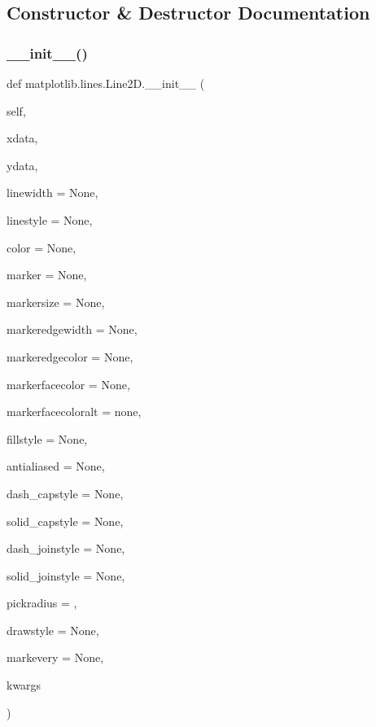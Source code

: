 \subsection{Constructor \& Destructor Documentation}
\mbox{\label{classmatplotlib_1_1lines_1_1Line2D_ac8fbafde2dbca785493d2eeefa1540b9}} 
\subsubsection{\texorpdfstring{\+\_\+\+\_\+init\+\_\+\+\_\+()}{\_\_init\_\_()}}
{\footnotesize\ttfamily def matplotlib.\+lines.\+Line2\+D.\+\_\+\+\_\+init\+\_\+\+\_\+ (\begin{DoxyParamCaption}\item[{}]{self,  }\item[{}]{xdata,  }\item[{}]{ydata,  }\item[{}]{linewidth = {\ttfamily None},  }\item[{}]{linestyle = {\ttfamily None},  }\item[{}]{color = {\ttfamily None},  }\item[{}]{marker = {\ttfamily None},  }\item[{}]{markersize = {\ttfamily None},  }\item[{}]{markeredgewidth = {\ttfamily None},  }\item[{}]{markeredgecolor = {\ttfamily None},  }\item[{}]{markerfacecolor = {\ttfamily None},  }\item[{}]{markerfacecoloralt = {\ttfamily \textquotesingle{}none\textquotesingle{}},  }\item[{}]{fillstyle = {\ttfamily None},  }\item[{}]{antialiased = {\ttfamily None},  }\item[{}]{dash\+\_\+capstyle = {\ttfamily None},  }\item[{}]{solid\+\_\+capstyle = {\ttfamily None},  }\item[{}]{dash\+\_\+joinstyle = {\ttfamily None},  }\item[{}]{solid\+\_\+joinstyle = {\ttfamily None},  }\item[{}]{pickradius = {},  }\item[{}]{drawstyle = {\ttfamily None},  }\item[{}]{markevery = {\ttfamily None},  }\item[{}]{kwargs }\end{DoxyParamCaption})}

